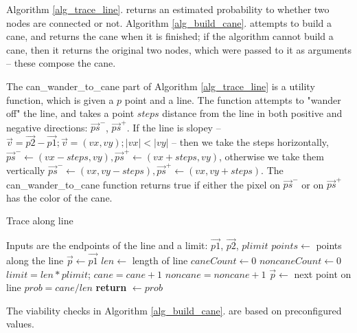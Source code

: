 \documentclass{PSAIE}%
\begin{document}
Algorithm \ref{alg_trace_line}. returns an estimated probability to whether two nodes are connected or not.
Algorithm \ref{alg_build_cane}. attempts to build a cane, and returns the cane when it is finished; if the
algorithm cannot build a cane, then it returns the original two nodes, which were passed to it as arguments
-- these compose the cane.

The can\_wander\_to\_cane part of Algorithm \ref{alg_trace_line} is a utility function, which is given
a $p$ point and a line. The function attempts to "wander off" the line, and takes a point $steps$ distance from the
line in both positive and negative directions: $\vec{ps}^-$, $\vec{ps}^+$. If the line is slopey --
$\vec{v} = \vec{p2} - \vec{p1}; \vec{v} = (vx, vy); |vx| < |vy|$ -- then we take the steps horizontally,
$\vec{ps}^- \gets (vx - steps, vy), \vec{ps}^+ \gets (vx + steps, vy)$, otherwise we take them vertically
$\vec{ps}^- \gets (vx, vy - steps), \vec{ps}^+ \gets (vx, vy + steps)$. The can\_wander\_to\_cane function
returns true if either the pixel on $\vec{ps}^-$ or on $\vec{ps}^+$ has the color of the cane.

\begin{algorithm}
      \caption{Trace along line}
      \label{alg_trace_line}
      \begin{algorithmic}
            \Comment Inputs are the endpoints of the line and a limit: $\vec{p1}$, $\vec{p2}$, $plimit$
            \State $points \gets$ points along the line
            \State $\vec{p}\gets \vec{p1}$
            \State $len \gets$ length of line
            \State $caneCount \gets 0$
            \State $noncaneCount \gets 0$
            \State $limit = len * plimit$; 
            \State $cane = cane + 1$
            \Else
            \State $noncane = noncane + 1$
            \EndIf
            \State $\vec{p} \gets$ next point on line
            \EndWhile
            \State $prob = cane / len$
            \State \textbf{return} $\gets prob$
            \EndFunction
      \end{algorithmic}
\end{algorithm}

The viability checks in Algorithm \ref{alg_build_cane}. are based on preconfigured values.
\end{document}
